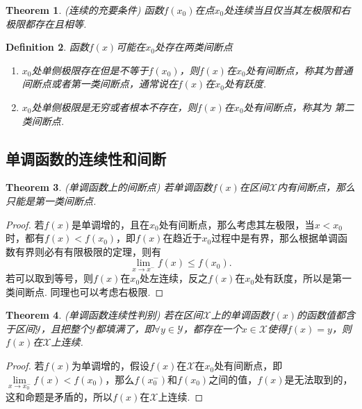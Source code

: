 \documentclass{article}
\newtheorem{theorem}{Theorem}[section]
\newtheorem{definition}[theorem]{Definition}
\begin{document}
\begin{theorem}
\rm {\color{red} (连续的充要条件)} 函数$f(x_0)$在点$x_0$处连续当且仅当其左极限和右极限都存在且相等.
\end{theorem}

\begin{definition}
\rm 函数$f(x)$可能在$x_0$处存在两类间断点
\begin{enumerate}
	\item $x_0$处单侧极限存在但是不等于$f(x_0)$，则$f(x)$在$x_0$处有间断点，称其为{\color{red}普通间断点}或者{\color{red}第一类间断点}，通常说在$f(x)$在$x_0$处有{\color{red}跃度}.
	\item $x_0$处单侧极限是无穷或者根本不存在，则$f(x)$在$x_0$处有间断点，称其为{\color{red} 第二类间断点}.
\end{enumerate}
\end{definition}

\subsection{单调函数的连续性和间断}

\begin{theorem}
\rm {\color{red} (单调函数上的间断点)} 若单调函数$f(x)$在区间$\mathcal{X}$内有间断点，那么只能是第一类间断点.
\end{theorem}

\begin{proof}
若$f(x)$是单调增的，且在$x_0$处有间断点，那么考虑其左极限，当$x < x_0$时，都有$f(x) < f(x_0)$，即$f(x)$在趋近于$x_0$过程中是有界，那么根据单调函数有界则必有有限极限的定理，则有
$$
\lim\limits_{x \rightarrow x^-} f(x) \leq f(x_0).
$$
若可以取到等号，则$f(x)$在$x_0$处左连续，反之$f(x)$在$x_0$处有跃度，所以是第一类间断点. 同理也可以考虑右极限.
\end{proof}

\begin{theorem}
\rm {\color{red} (单调函数连续性判别)} 若在区间$\mathcal{X}$上的单调函数$f(x)$的函数值都含于区间$\mathcal{Y}$，且把整个$\mathcal{Y}$都填满了，即$\forall y \in \mathcal{Y}$，都存在一个$x \in \mathcal{X}$使得$f(x) = y$，则$f(x)$在$\mathcal{X}$上连续.
\end{theorem}

\begin{proof}
若$f(x)$为单调增的，假设$f(x)$在$\mathcal{X}$在$x_0$处有间断点，即$\lim\limits_{x \rightarrow x_0 ^-} f(x) < f(x_0)$，那么$f(x_0^-)$和$f(x_0)$之间的值，$f(x)$是无法取到的，这和命题是矛盾的，所以$f(x)$在$\mathcal{X}$上连续.
\end{proof}
\end{document}

